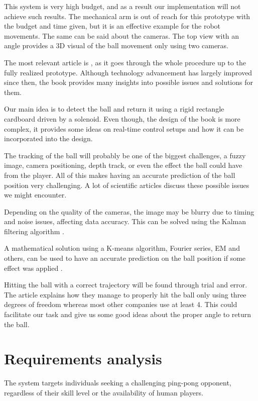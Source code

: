 This system is very high budget, and as a result our implementation will not achieve such results. The mechanical arm is out of reach for this prototype with the budget and time given, but it is an effective example for the robot movements. The same can be said about the cameras. The top view with an angle provides a 3D visual of the ball movement only using two cameras.

The most relevant article is \cite{Acosta2004}, as it goes through the whole procedure up to the fully realized prototype. Although technology advancement has largely improved since then, the book provides many insights into possible issues and solutions for them.

Our main idea is to detect the ball and return it using a rigid rectangle cardboard driven by a solenoid. Even though, the design of the book \cite{Yu2012} is more complex, it provides some ideas on real-time control setups and how it can be incorporated into the design.

The tracking of the ball will probably be one of the biggest challenges, a fuzzy image, camera positioning, depth track, or even the effect the ball could have from the player. All of this makes having an accurate prediction of the ball position very challenging. A lot of scientific articles discuss these possible issues we might encounter.

Depending on the quality of the cameras, the image may be blurry due to timing and noise issues, affecting data accuracy. This can be solved using the Kalman filtering algorithm \cite{Lu2020}.

A mathematical solution using a K-means algorithm, Fourier series, EM and others, can be used to have an accurate prediction on the ball position if some effect was applied  \cite{Zhao2017}.

Hitting the ball with a correct trajectory will be found through trial and error. The article \cite{Trasloheros2014} explains how they manage to properly hit the ball only using three degrees of freedom whereas most other companies use at least 4. This could facilitate our task and give us some good ideas about the proper angle to return the ball.


\section{Requirements analysis}

The system targets individuals seeking a challenging ping-pong opponent, regardless of their skill level or the availability of human players.

